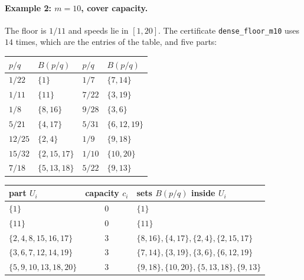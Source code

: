 \documentclass[11pt]{article}
\theoremstyle{remark}
\begin{document}
\paragraph{Example 2: $m=10$, cover capacity.} The floor is $1/11$ and speeds lie in $[1,20]$. The certificate \texttt{dense\_floor\_m10} uses $14$ times, which are the entries of the table, and five parts:
\begin{center}
\begin{tabular}{llll}
\toprule
$p/q$ & $B(p/q)$ & $p/q$ & $B(p/q)$\\
\midrule
$1/22$ & $\{1\}$ & $1/7$ & $\{7,14\}$\\
$1/11$ & $\{11\}$ & $7/22$ & $\{3,19\}$\\
$1/8$ & $\{8,16\}$ & $9/28$ & $\{3,6\}$\\
$5/21$ & $\{4,17\}$ & $5/31$ & $\{6,12,19\}$\\
$12/25$ & $\{2,4\}$ & $1/9$ & $\{9,18\}$\\
$15/32$ & $\{2,15,17\}$ & $1/10$ & $\{10,20\}$\\
$7/18$ & $\{5,13,18\}$ & $5/22$ & $\{9,13\}$\\
\bottomrule
\end{tabular}
\end{center}
\begin{center}
\begin{tabular}{lcl}
\toprule
part $U_i$ & capacity $c_i$ & sets $B(p/q)$ inside $U_i$\\
\midrule
$\{1\}$ & $0$ & $\{1\}$\\
$\{11\}$ & $0$ & $\{11\}$\\
$\{2,4,8,15,16,17\}$ & $3$ & $\{8,16\},\{4,17\},\{2,4\},\{2,15,17\}$\\
$\{3,6,7,12,14,19\}$ & $3$ & $\{7,14\},\{3,19\},\{3,6\},\{6,12,19\}$\\
$\{5,9,10,13,18,20\}$ & $3$ & $\{9,18\},\{10,20\},\{5,13,18\},\{9,13\}$\\
\bottomrule
\end{tabular}
\end{center}
\end{document}
